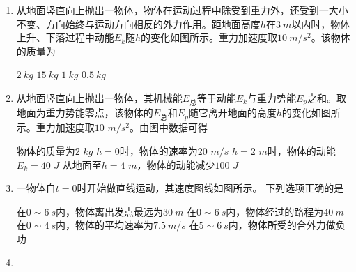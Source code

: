 
\begin{enumerate}[leftmargin=0em]
\renewcommand{\labelenumi}{\arabic{enumi}.}
\item
{}
从地面竖直向上抛出一物体，物体在运动过程中除受到重力外，还受到一大小不变、方向始终与运动方向相反的外力作用。距地面高度$ h $在$ 3 \ m $以内时，物体上升、下落过程中动能$ E_{k} $随$ h $的变化如图所示。重力加速度取$ 10 \ m/s^{2} $。该物体的质量为  
\begin{figure}[h!]
\centering

\end{figure}

\fourchoices
{$ 2 \ kg $}
{$ 15 \ kg $	}
{$ 1 \ kg $}
{$ 0.5 \ kg $}


\item 
{}
从地面竖直向上抛出一物体，其机械能$ E_{ \text{总} } $等于动能$ E_{k} $与重力势能$ E_{p} $之和。取地面为重力势能零点，该物体的$ E_{ \text{总} } $和$ E_{p} $随它离开地面的高度$ h $的变化如图所示。重力加速度取$ 10 $ $ m/s^{2} $。由图中数据可得  
\begin{figure}[h!]
\centering

\end{figure}


\fourchoices
{物体的质量为$ 2 $ $ kg $}
{$ h=0 $时，物体的速率为$ 20 $ $ m/s $}
{$ h=2 $ $ m $时，物体的动能$ E_{k} =40 $ $ J $}
{从地面至$ h=4 $ $ m $，物体的动能减少$ 100 $ $ J $}


\item 
{}
一物体自$ t=0 $时开始做直线运动，其速度图线如图所示。
下列选项正确的是  
\begin{figure}[h!]
\centering

\end{figure}

\fourchoices
{在$ 0 \sim 6\ s $内，物体离出发点最远为$ 30 \ m $}
{在$ 0 \sim 6\ s $内，物体经过的路程为$ 40 \ m $}
{在$ 0 \sim 4\ s $内，物体的平均速率为$ 7.5 \ m/s $}
{在$ 5 \sim 6\ s $内，物体所受的合外力做负功}


\item 
{}


\end{enumerate}
